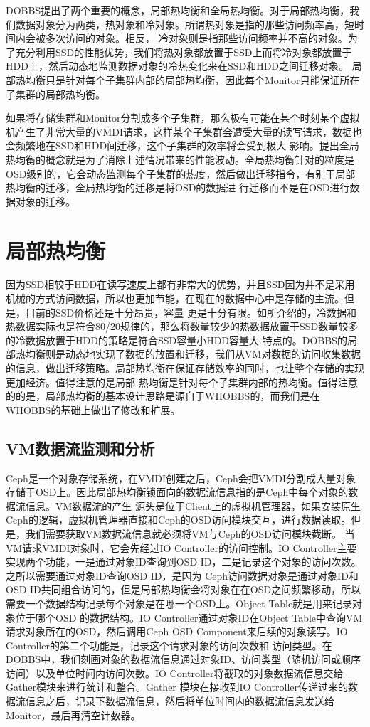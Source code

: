 DOBBS提出了两个重要的概念，局部热均衡和全局热均衡。对于局部热均衡，我们数据对象分为两类，热对象和冷对象。所谓热对象是指的那些访问频率高，短时间内会被多次访问的对象。相反，
冷对象则是指那些访问频率并不高的对象。为了充分利用SSD的性能优势，我们将热对象都放置于SSD上而将冷对象都放置于HDD上，然后动态地监测数据对象的冷热变化来在SSD和HDD之间迁移对象。
局部热均衡只是针对每个子集群内部的局部热均衡，因此每个Monitor只能保证所在子集群的局部热均衡。

如果将存储集群和Monitor分割成多个子集群，那么极有可能在某个时刻某个虚拟机产生了非常大量的VMDI请求，这样某个子集群会遭受大量的读写请求，数据也会频繁地在SSD和HDD间迁移，这个子集群的效率将会受到极大
影响。提出全局热均衡的概念就是为了消除上述情况带来的性能波动。全局热均衡针对的粒度是OSD级别的，它会动态监测每个子集群的热度，然后做出迁移指令，有别于局部热均衡的迁移，全局热均衡的迁移是将OSD的数据进
行迁移而不是在OSD进行数据对象的迁移。

\section{局部热均衡}
因为SSD相较于HDD在读写速度上都有非常大的优势，并且SSD因为并不是采用机械的方式访问数据，所以也更加节能，在现在的数据中心中是存储的主流。但是，目前的SSD价格还是十分昂贵，容量
更是十分有限。如所介绍的，冷数据和热数据实际也是符合80/20规律的，那么将数量较少的热数据放置于SSD数量较多的冷数据放置于HDD的策略是符合SSD容量小HDD容量大
特点的。DOBBS的局部热均衡则是动态地实现了数据的放置和迁移，我们从VM对数据的访问收集数据的信息，做出迁移策略。局部热均衡在保证存储效率的同时，也让整个存储的实现更加经济。值得注意的是局部
热均衡是针对每个子集群内部的热均衡。值得注意的的是，局部热均衡的基本设计思路是源自于WHOBBS\cite{lingxuan2015whobbs}的，而我们是在WHOBBS的基础上做出了修改和扩展。

\subsection{VM数据流监测和分析}
Ceph是一个对象存储系统，在VMDI创建之后，Ceph会把VMDI分割成大量对象存储于OSD上\cite{weil2006ceph}。因此局部热均衡锁面向的数据流信息指的是Ceph中每个对象的数据流信息。VM数据流的产生
源头是位于Client上的虚拟机管理器，如果安装原生Ceph的逻辑，虚拟机管理器直接和Ceph的OSD访问模块交互，进行数据读取。但是，我们需要获取VM数据流信息就必须将VM与Ceph的OSD访问模块截断。
当VM请求VMDI对象时，它会先经过IO Controller的访问控制。IO Controller主要实现两个功能，一是通过对象ID查询到OSD ID，二是记录这个对象的访问次数。之所以需要通过对象ID查询OSD ID，是因为
Ceph访问数据对象是通过对象ID和OSD ID共同组合访问的，但是局部热均衡会将对象在在OSD之间频繁移动，所以需要一个数据结构记录每个对象是在哪一个OSD上。Object Table就是用来记录对象位于哪个OSD
的数据结构。IO Controller通过对象ID在Object Table中查询VM请求对象所在的OSD，然后调用Ceph OSD Component来后续的对象读写。IO Controller的第二个功能是，记录这个请求对象的访问次数和
访问类型。在DOBBS中，我们刻画对象的数据流信息通过对象ID、访问类型（随机访问或顺序访问）以及单位时间内访问次数。IO Controller将截取的对象数据流信息交给Gather模块来进行统计和整合。Gather
模块在接收到IO Controller传递过来的数据流信息之后，记录下数据流信息，然后将单位时间内的数据流信息发送给Monitor，最后再清空计数器。

